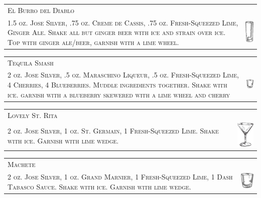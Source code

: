 \documentclass{article}
\begin{document}
\begin{tabular}{b{2.5in} m{0.625in}}
  \multicolumn{2}{p{3.0in}}{\centering\Huge\textsc{El Burro del Diablo}} \\ 
  
  \textsc{1.5 oz. Jose Silver, .75 oz. Creme de Cassis, .75
    oz. Fresh-Squeezed Lime, Ginger Ale. Shake all but ginger beer
    with ice and strain over ice. Top with ginger ale/beer, garnish
    with a lime wheel.} & \includegraphics[width=0.5in]{collins.png}
\end{tabular}

\begin{tabular}{b{2.5in} m{0.625in}}
  \multicolumn{2}{p{3.0in}}{\centering\Huge\textsc{Tequila Smash}} \\ 
  
  \textsc{2 oz. Jose Silver, .5 oz. Maraschino Liqueur, .5
    oz. Fresh-Squeezed Lime, 4 Cherries, 4 Blueberries. Muddle
    ingredients together. Shake with ice.  garnish with a blueberry
    skewered with a lime wheel and cherry} &
  \includegraphics[width=0.5in]{rocks_glass.png}
\end{tabular}

\begin{tabular}{b{2.5in} m{0.625in}}
  \multicolumn{2}{p{3.0in}}{\centering\Huge\textsc{Lovely St. Rita}} \\ 
  
  \textsc{2 oz. Jose Silver, 1 oz. St. Germain, 1 Fresh-Squeezed
    Lime. Shake with ice.  Garnish with lime wedge.} &
  \includegraphics[width=0.5in]{goblet.png}
\end{tabular}

\begin{tabular}{b{2.5in} m{0.625in}}
  \multicolumn{2}{p{3.0in}}{\centering\Huge\textsc{Machete}} \\ 
  
  \textsc{2 oz. Jose Silver, 1 oz. Grand Marnier, 1 Fresh-Squeezed
    Lime, 1 Dash Tabasco Sauce. Shake with ice. Garnish with lime
    wedge.} & \includegraphics[width=0.5in]{rocks_glass.png}
\end{tabular}
\end{document}
